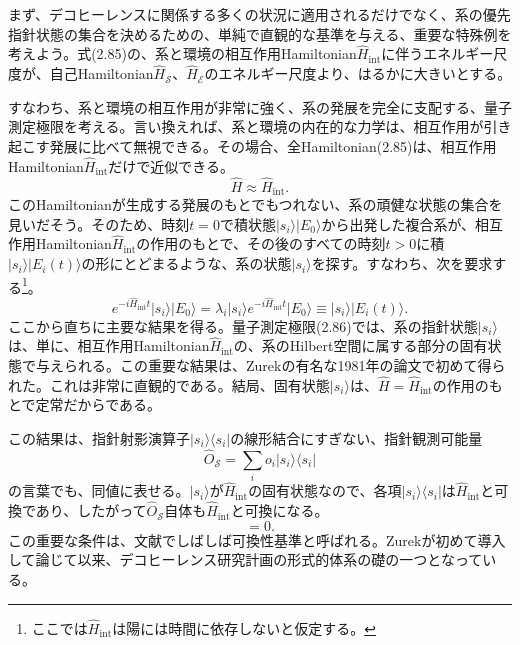 

まず、デコヒーレンスに関係する多くの状況に適用されるだけでなく、系の優先指針状態の集合を決めるための、単純で直観的な基準を与える、重要な特殊例を考えよう。式(2.85)の、系と環境の相互作用Hamiltonian$\hat H_{\mathrm{int}}$に伴うエネルギー尺度が、自己Hamiltonian$\hat H_{\mathcal S}$、$\hat H_{\mathcal E}$のエネルギー尺度より、はるかに大きいとする。

\hypertarget{srcpage:77}{}\label{srcpage:77}
すなわち、系と環境の相互作用が非常に強く、系の発展を完全に支配する、量子測定極限を考える。言い換えれば、系と環境の内在的な力学は、相互作用が引き起こす発展に比べて無視できる。その場合、全Hamiltonian(2.85)は、相互作用Hamiltonian$\hat H_{\mathrm{int}}$だけで近似できる。
\begin{equation}\hat H\approx\hat H_{\mathrm{int}}.\tag{2.86}\end{equation}
このHamiltonianが生成する発展のもとでもつれない、系の頑健な状態の集合を見いだそう。そのため、時刻$t=0$で積状態$\lvert s_i\rangle\lvert E_0\rangle$から出発した複合系が、相互作用Hamiltonian$\hat H_{\mathrm{int}}$の作用のもとで、その後のすべての時刻$t>0$に積$\lvert s_i\rangle\lvert E_i(t)\rangle$の形にとどまるような、系の状態$\lvert s_i\rangle$を探す。すなわち、次を要求する\footnote{ここでは$\hat H_{\mathrm{int}}$は陽には時間に依存しないと仮定する。}。
\begin{equation}e^{-i\hat H_{\mathrm{int}}t}\lvert s_i\rangle\lvert E_0\rangle=\lambda_i\lvert s_i\rangle e^{-i\hat H_{\mathrm{int}}t}\lvert E_0\rangle\equiv\lvert s_i\rangle\lvert E_i(t)\rangle.\tag{2.87}\end{equation}
ここから直ちに主要な結果を得る。量子測定極限(2.86)では、系の指針状態$\lvert s_i\rangle$は、単に、相互作用Hamiltonian$\hat H_{\mathrm{int}}$の、系のHilbert空間に属する部分の固有状態で与えられる。この重要な結果は、Zurekの有名な1981年の論文\cite{ref008}で初めて得られた。これは非常に直観的である。結局、固有状態$\lvert s_i\rangle$は、$\hat H=\hat H_{\mathrm{int}}$の作用のもとで定常だからである。

この結果は、指針射影演算子$\lvert s_i\rangle\langle s_i\rvert$の線形結合にすぎない、指針観測可能量
\begin{equation}\hat O_{\mathcal S}=\sum_i o_i\lvert s_i\rangle\langle s_i\rvert\tag{2.88}\end{equation}
の言葉でも、同値に表せる。$\lvert s_i\rangle$が$\hat H_{\mathrm{int}}$の固有状態なので、各項$\lvert s_i\rangle\langle s_i\rvert$は$\hat H_{\mathrm{int}}$と可換であり、したがって$\hat O_{\mathcal S}$自体も$\hat H_{\mathrm{int}}$と可換になる。
\begin{equation}[\hat O_{\mathcal S},\hat H_{\mathrm{int}}]=0.\tag{2.89}\end{equation}
この重要な条件は、文献でしばしば可換性基準と呼ばれる。Zurek\cite{ref008,ref009}が初めて導入して論じて以来、デコヒーレンス研究計画の形式的体系の礎の一つとなっている。

